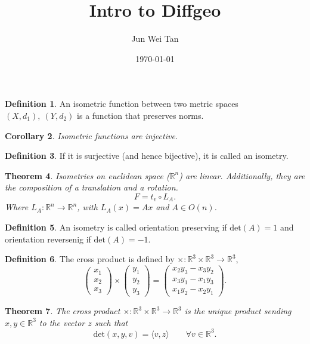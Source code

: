 \documentclass[prb,12pt]{revtex4-2}
\newtheorem{Theorem}{Theorem}
\newtheorem{Corollary}[Theorem]{Corollary}
\theoremstyle{definition}
\theoremstyle{definition}
\newtheorem{Definition}[Theorem]{Definition}
\newcommand{\R}{\mathbb{R}}
\begin{document}
\title{Intro to Diffgeo}
\author{Jun Wei Tan}
\date{\today}
\maketitle
\begin{Definition}
	An isometric function between two metric spaces $(X,d_1),~(Y,d_2)$ is a function that preserves norms.
\end{Definition}
\begin{Corollary}
	Isometric functions are injective.
\end{Corollary}
\begin{Definition}
	If it is surjective (and hence bijective), it is called an isometry.
\end{Definition}
\begin{Theorem}
	Isometries on euclidean space ($\R^n$) are linear. Additionally, they are the composition of a translation and a rotation.
	\[
	F=t_v\circ L_A
	.\] 
	Where $L_A:\R^n\to\R^n$, with $L_A(x)=Ax$ and $A\in O(n)$. 
\end{Theorem}
\begin{Definition}
	An isometry is called orientation preserving if $\text{det}(A)=1$ and orientation reversenig if $\text{det}(A)=-1$.
\end{Definition}
\begin{Definition}
	The cross product is defined by $\times:\R^3\times \R^3\to \R^3$,
	\[
	\begin{pmatrix} x_1 \\ x_2 \\ x_3 \end{pmatrix} \times \begin{pmatrix} y_1 \\ y_2 \\ y_3 \end{pmatrix} =\begin{pmatrix} x_2y_3-x_3y_2\\x_3y_1-x_1y_3 \\ x_1y_2 - x_2y_1 \end{pmatrix} 
	.\] 
\end{Definition}
\begin{Theorem}
	The cross product $\times:\R^3\times\R^3\to \R^3$ is the unique product sending $x,y\in \R^3$ to the vector $z$ such that
	\[
		\text{det}(x,y,v)=\langle v,z\rangle\qquad \forall v\in \R^3
	.\] 
\end{Theorem}
\end{document}
